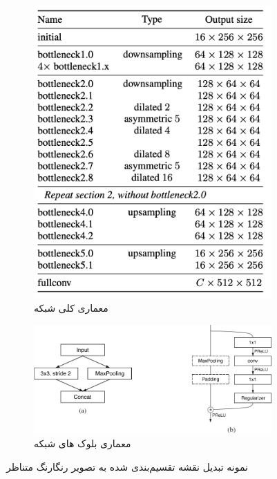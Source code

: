 \begin{figure}[ht]
	\begin{subfigure}{0.45\textwidth}
		\includegraphics[width=\linewidth, height=0.3\textheight]{Images/Chapter3/ENet.png}
		\caption{معماری کلی شبکه }
		\label{f64}
	\end{subfigure}\hfil
	\begin{subfigure}{0.45\textwidth}
		\includegraphics[width=\linewidth, height=0.2\textheight]{Images/Chapter3/ENet_blocks.png}
		\caption{معماری بلوک های شبکه }
		\label{f65}
	\end{subfigure}
	\centering
	\caption{نمونه تبدیل نقشه تقسیم‌بندی شده به تصویر رنگارنگ متناظر}
	\label{fig:fig7}
\end{figure}

